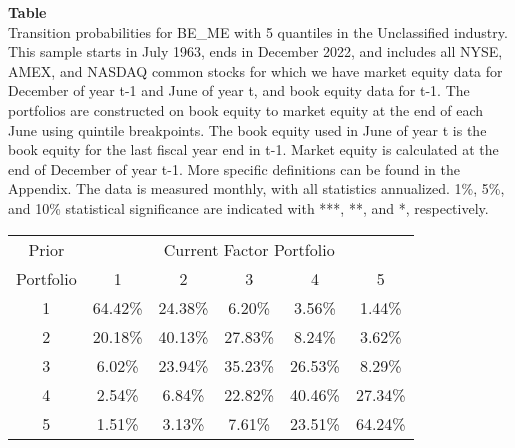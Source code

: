 \begin{table*}[ht!]
\raggedright
{}
\label{tab: transition_probs_BE_ME_Unclassified_with_5_quantiles}
\textbf{Table \thetable} \\
Transition probabilities for BE_ME with 5 quantiles in the Unclassified industry. \\
\hspace*{1em}This sample starts in July 1963, ends in December 2022, and includes all NYSE, AMEX, and NASDAQ common stocks for which we have market equity data for December of year t-1 and June of year t, and book equity data for t-1. The portfolios are constructed on book equity to market equity at the end of each June using quintile breakpoints.  The book equity used in June of year t is the book equity for the last fiscal year end in t-1.  Market equity is calculated at the end of December of year t-1.  More specific definitions can be found in the Appendix.  The data is measured monthly, with all statistics annualized.  1\%, 5\%, and 10\% statistical significance are indicated with ***, **, and *, respectively. \\
\vspace{0.5em}
\centering
\begin{adjustbox}{max width=\textwidth}
\begin{tabular}{@{}cccccc@{}}
\toprule
Prior & \multicolumn{5}{c}{Current Factor Portfolio} \\
Portfolio & 1 & 2 & 3 & 4 & 5 \\
\midrule
1 & 64.42\% & 24.38\% & 6.20\% & 3.56\% & 1.44\% \\
2 & 20.18\% & 40.13\% & 27.83\% & 8.24\% & 3.62\% \\
3 & 6.02\% & 23.94\% & 35.23\% & 26.53\% & 8.29\% \\
4 & 2.54\% & 6.84\% & 22.82\% & 40.46\% & 27.34\% \\
5 & 1.51\% & 3.13\% & 7.61\% & 23.51\% & 64.24\% \\
\bottomrule
\end{tabular}
\end{adjustbox}
\end{table*}